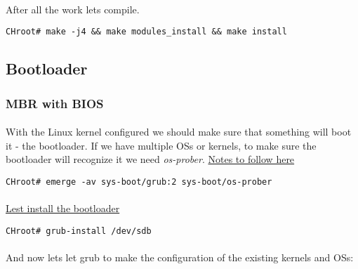 \documentclass[10pt,a4paper]{article}
\begin{document}
                \newpage
                \paragraph{} After all the work lets compile.

                \begin{lstlisting}[style=BashInputCHRoot]
 CHroot# make -j4 && make modules_install && make install
                \end{lstlisting}

            \newpage
            \subsection{Bootloader}

                \subsubsection{MBR with BIOS}

                    \paragraph{} With the Linux kernel configured we should make sure that something will boot it - the bootloader. If we have multiple OSs or kernels, to make sure the bootloader will recognize it we need \textit{os-prober}. \href{https://wiki.gentoo.org/wiki/GRUB2}{Notes to follow here}

                    \begin{lstlisting}[style=BashInputCHRoot]
 CHroot# emerge -av sys-boot/grub:2 sys-boot/os-prober
                    \end{lstlisting}

                    \paragraph{}  \href{https://wiki.gentoo.org/wiki/GRUB2#BIOS_with_MBR}{Lest install the bootloader}

                    \begin{lstlisting}[style=BashInputCHRoot]
 CHroot# grub-install /dev/sdb
                    \end{lstlisting}

                    \paragraph{} And now lets let grub to make the configuration of the existing kernels and OSs:
\end{document}

